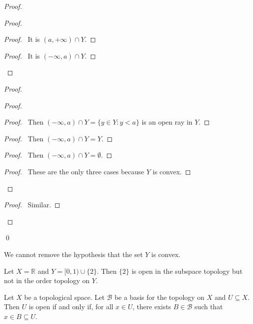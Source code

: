 \begin{proof}
\pf
{}
\begin{proof}
	\begin{proof}
		\pf\ It is $(a, +\infty) \cap Y$.
	\end{proof}
	\begin{proof}
		\pf\ It is $(-\infty, a) \cap Y$.
	\end{proof}
\end{proof}
\begin{proof}
	\begin{proof}
		\begin{proof}
			\pf\ Then $(-\infty, a) \cap Y = \{ y \in Y : y < a\}$ is an open ray in $Y$.
		\end{proof}
		\begin{proof}
			\pf\ Then $(-\infty, a) \cap Y = Y$. 
		\end{proof}
		\begin{proof}
			\pf\ Then $(-\infty, a) \cap Y = \emptyset$. 
		\end{proof}
		\qedstep
		\begin{proof}
			\pf\ These are the only three cases because $Y$ is convex.
		\end{proof}
	\end{proof}
	\begin{proof}
		\pf\ Similar.
	\end{proof}
\end{proof}
\qed
\end{proof}

\begin{ex}
We cannot remove the hypothesis that the set $Y$ is convex.

Let $X = \mathbb{R}$ and $Y = [0,1) \cup \{2\}$. Then $\{2\}$ is open in the subspace topology but not in the order topology on $Y$.
\end{ex}

\begin{prop}
Let $X$ be a topological space. Let $\mathcal{B}$ be a basis for the topology on $X$ and $U \subseteq X$. Then $U$ is open if and only if, for all $x \in U$, there exists $B \in \mathcal{B}$ such that $x \in B \subseteq U$.
\end{prop}

